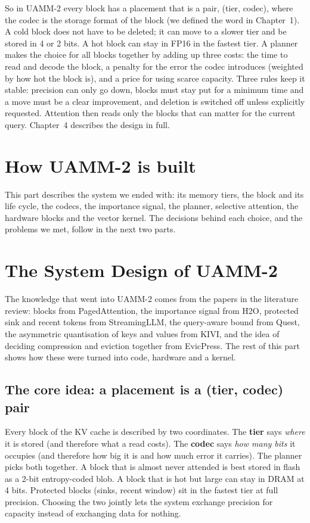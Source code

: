 \documentclass[12pt,a4paper]{report}
\begin{document}
So in UAMM-2 every block has a placement that is a pair, (tier, codec), where the codec is the storage format of the block (we defined the word in Chapter~1). A cold block does not have to be deleted; it can move to a slower tier and be stored in 4 or 2 bits. A hot block can stay in FP16 in the fastest tier. A planner makes the choice for all blocks together by adding up three costs: the time to read and decode the block, a penalty for the error the codec introduces (weighted by how hot the block is), and a price for using scarce capacity. Three rules keep it stable: precision can only go down, blocks must stay put for a minimum time and a move must be a clear improvement, and deletion is switched off unless explicitly requested. Attention then reads only the blocks that can matter for the current query. Chapter~4 describes the design in full.

\section{How UAMM-2 is built}
This part describes the system we ended with: its memory tiers, the block and its life cycle, the codecs, the importance signal, the planner, selective attention, the hardware blocks and the vector kernel. The decisions behind each choice, and the problems we met, follow in the next two parts.

\section{The System Design of UAMM-2}\label{sec:5}
The knowledge that went into UAMM-2 comes from the papers in the literature review: blocks from PagedAttention, the importance signal from H2O, protected sink and recent tokens from StreamingLLM, the query-aware bound from Quest, the asymmetric quantisation of keys and values from KIVI, and the idea of deciding compression and eviction together from EvicPress. The rest of this part shows how these were turned into code, hardware and a kernel.

\subsection{The core idea: a placement is a (tier, codec) pair}\label{sec:5_1}
Every block of the KV cache is described by two coordinates. The \textbf{tier} says \textit{where} it is stored (and therefore what a read costs). The \textbf{codec} says \textit{how many bits} it occupies (and therefore how big it is and how much error it carries). The planner picks both together. A block that is almost never attended is best stored in flash as a 2-bit entropy-coded blob. A block that is hot but large can stay in DRAM at 4 bits. Protected blocks (sinks, recent window) sit in the fastest tier at full precision. Choosing the two jointly lets the system exchange precision for capacity instead of exchanging data for nothing.
\end{document}

